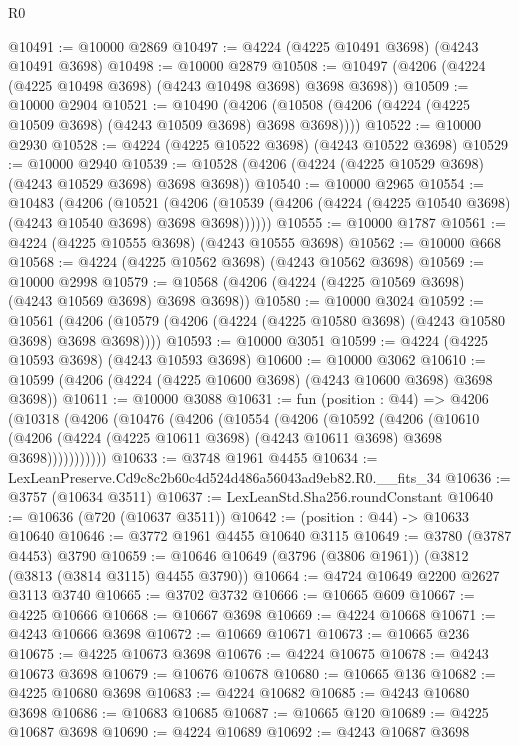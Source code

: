 \begin{lexlean}{R0}
\begin{coremodule}
@10491 := @10000 @2869
@10497 := @4224 (@4225 @10491 @3698) (@4243 @10491 @3698)
@10498 := @10000 @2879
@10508 := @10497 (@4206 (@4224 (@4225 @10498 @3698) (@4243 @10498 @3698) @3698 @3698))
@10509 := @10000 @2904
@10521 := @10490
    (@4206 (@10508 (@4206 (@4224 (@4225 @10509 @3698) (@4243 @10509 @3698) @3698 @3698))))
@10522 := @10000 @2930
@10528 := @4224 (@4225 @10522 @3698) (@4243 @10522 @3698)
@10529 := @10000 @2940
@10539 := @10528 (@4206 (@4224 (@4225 @10529 @3698) (@4243 @10529 @3698) @3698 @3698))
@10540 := @10000 @2965
@10554 := @10483
    (@4206
      (@10521
        (@4206 (@10539 (@4206 (@4224 (@4225 @10540 @3698) (@4243 @10540 @3698) @3698 @3698))))))
@10555 := @10000 @1787
@10561 := @4224 (@4225 @10555 @3698) (@4243 @10555 @3698)
@10562 := @10000 @668
@10568 := @4224 (@4225 @10562 @3698) (@4243 @10562 @3698)
@10569 := @10000 @2998
@10579 := @10568 (@4206 (@4224 (@4225 @10569 @3698) (@4243 @10569 @3698) @3698 @3698))
@10580 := @10000 @3024
@10592 := @10561
    (@4206 (@10579 (@4206 (@4224 (@4225 @10580 @3698) (@4243 @10580 @3698) @3698 @3698))))
@10593 := @10000 @3051
@10599 := @4224 (@4225 @10593 @3698) (@4243 @10593 @3698)
@10600 := @10000 @3062
@10610 := @10599 (@4206 (@4224 (@4225 @10600 @3698) (@4243 @10600 @3698) @3698 @3698))
@10611 := @10000 @3088
@10631 := fun (position : @44) =>
  @4206
    (@10318
      (@4206
        (@10476
          (@4206
            (@10554
              (@4206
                (@10592
                  (@4206
                    (@10610
                      (@4206 (@4224 (@4225 @10611 @3698) (@4243 @10611 @3698) @3698 @3698)))))))))))
@10633 := @3748 @1961 @4455
@10634 := LexLeanPreserve.Cd9c8c2b60c4d524d486a56043ad9eb82.R0.__fits_34
@10636 := @3757 (@10634 @3511)
@10637 := LexLeanStd.Sha256.roundConstant
@10640 := @10636 (@720 (@10637 @3511))
@10642 := (position : @44) -> @10633 @10640
@10646 := @3772 @1961 @4455 @10640 @3115
@10649 := @3780 (@3787 @4453) @3790
@10659 := @10646 @10649 (@3796 (@3806 @1961)) (@3812 (@3813 (@3814 @3115) @4455 @3790))
@10664 := @4724 @10649 @2200 @2627 @3113 @3740
@10665 := @3702 @3732
@10666 := @10665 @609
@10667 := @4225 @10666
@10668 := @10667 @3698
@10669 := @4224 @10668
@10671 := @4243 @10666 @3698
@10672 := @10669 @10671
@10673 := @10665 @236
@10675 := @4225 @10673 @3698
@10676 := @4224 @10675
@10678 := @4243 @10673 @3698
@10679 := @10676 @10678
@10680 := @10665 @136
@10682 := @4225 @10680 @3698
@10683 := @4224 @10682
@10685 := @4243 @10680 @3698
@10686 := @10683 @10685
@10687 := @10665 @120
@10689 := @4225 @10687 @3698
@10690 := @4224 @10689
@10692 := @4243 @10687 @3698

\end{coremodule}
\end{lexlean}
